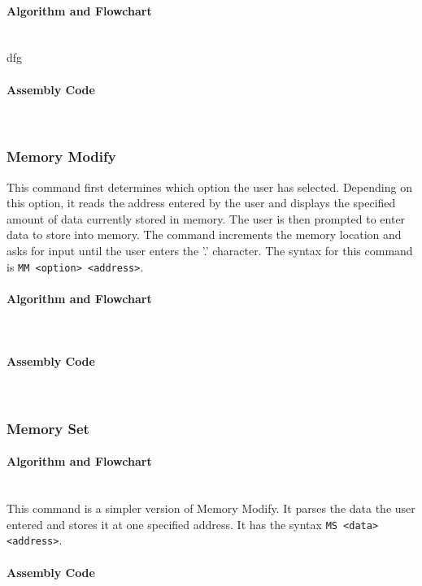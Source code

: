 \documentclass[12pt]{article}
\begin{document}
			\paragraph{Algorithm and Flowchart}~\\
			dfg
			\paragraph{Assembly Code}~\\
			
			
			\subsubsection{Memory Modify}
			This command first determines which option the user has selected. Depending on this option, it reads the address entered by the user and displays the specified amount of data currently stored in memory. The user is then prompted to enter data to store into memory. The command increments the memory location and asks for input until the user enters the '.' character. The syntax for this command is \texttt{MM <option> <address>}.
			\paragraph{Algorithm and Flowchart}~\\
			\paragraph{Assembly Code}~\\
			
			
			\subsubsection{Memory Set}
			\paragraph{Algorithm and Flowchart}~\\
			This command is a simpler version of Memory Modify. It parses the data the user entered and stores it at one specified address. It has the syntax \texttt{MS <data> <address>}.
			\paragraph{Assembly Code}~\\
			
			
\end{document}

